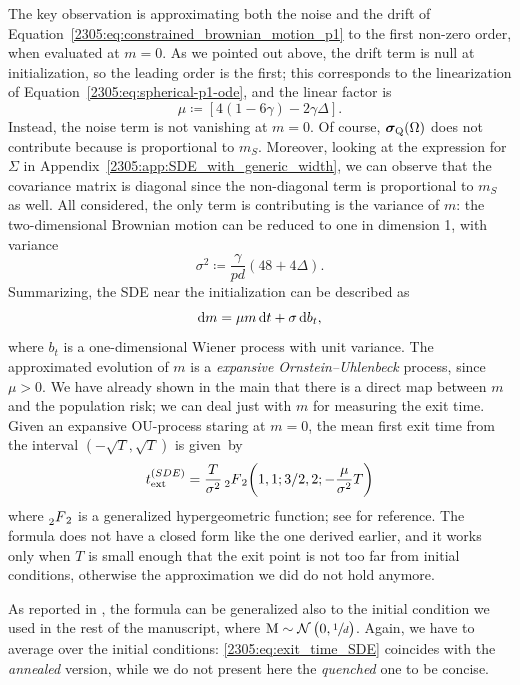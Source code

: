 The key observation is approximating both the noise and the drift of Equation~\eqref{2305:eq:constrained_brownian_motion_p1} to the first non-zero order, when evaluated at \(m=0\). As we pointed out above, the drift term is null at initialization, so the leading order is the first; this corresponds to the linearization of Equation~\eqref{2305:eq:spherical-p1-ode}, and the linear factor is
\begin{equation}
    \mu \coloneqq \left[4(1-6\gamma)-2\gamma\Delta\right].
\end{equation}
Instead, the noise term is not vanishing at \(m=0\). Of course, \({\boldsymbol{\sigma}}_{\mathrm{Q}}{(\Omega)}\) does not contribute because is proportional to \(m_S\). Moreover, looking at the expression for \(\Sigma\) in Appendix~\ref{2305:app:SDE_with_generic_width}, we can observe that the covariance matrix is diagonal since the non-diagonal term is proportional to \(m_S\) as well. All considered, the only term is contributing is the variance of \(m\): the two-dimensional Brownian motion can be reduced to one in dimension 1, with variance
\[
    \sigma^2 \coloneqq \frac{\gamma}{pd}(48+4\Delta).
\]
Summarizing, the SDE near the initialization can be described as
\begin{equation}
    \dif m = \mu m\dif t + \sigma \dif b_t,
\end{equation}
where \(b_t\) is a one-dimensional Wiener process with unit variance.
The approximated evolution of \(m\) is a \emph{expansive Ornstein--Uhlenbeck} process, since \(\mu>0\).
We have already shown in the main that there is a direct map between \(m\) and the population risk;
we can deal just with \(m\) for measuring the exit time.
Given an expansive OU-process staring at \(m=0\), the mean first exit time from the interval \((-\sqrt{T},\sqrt{T})\) is given~by~\cite{zeng2020mean}
\begin{equation} \label{2305:eq:exit_time_SDE}
  t^{(SDE)}_\text{ext} = \frac{T}{\sigma^2} \prescript{}{2}F_2{
    \left(1,1; 3/2,2; 
  -\frac{\mu}{\sigma^2}T\right)}
\end{equation}
where \(\prescript{}{2}F_2\) is a generalized hypergeometric function;
see \cite{zeng2020mean} for reference.
The formula does not have a closed form like the one derived earlier, and it works only when \(T\) is small enough that the exit point is not too far from initial conditions, otherwise the approximation we did do not hold anymore.

As reported in \cite{zeng2020mean}, the formula can be generalized also to the initial condition we used in the rest of the manuscript, where \(\mathrm{M} \sim \mathcal N \left(0,\sfrac{1}{d}\right)\). Again, we have to average over the initial conditions: \eqref{2305:eq:exit_time_SDE} coincides with the \emph{annealed} version, while we do not present here the \emph{quenched} one to be concise.
